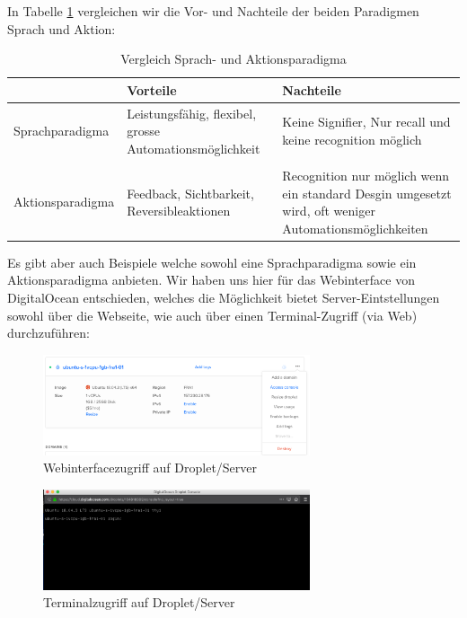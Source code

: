 \graphicspath{ {../images/} } 

In Tabelle \ref{table:1} vergleichen wir die Vor- und Nachteile der beiden Paradigmen Sprach und Aktion:
\begin{table}[h!]
\centering
  \begin{tabular}{||p{3cm}|p{5cm}|p{5cm}||} 
 \hline
 & Vorteile & Nachteile \\ [0.5ex] 
 \hline\hline
 Sprachparadigma & Leistungsfähig, flexibel, grosse Automationsmöglichkeit &
    Keine Signifier, Nur recall und keine recognition möglich \\ [1.5ex] 
    & & \\
 Aktionsparadigma & Feedback, Sichtbarkeit, Reversibleaktionen & Recognition nur
  möglich wenn ein standard Desgin umgesetzt wird, oft weniger
  Automationsmöglichkeiten \\
 \hline
\end{tabular}
\caption{Vergleich Sprach- und Aktionsparadigma}
\label{table:1}
\end{table}

Es gibt aber auch Beispiele welche sowohl eine Sprachparadigma sowie ein
Aktionsparadigma anbieten. Wir haben uns hier für das Webinterface von
DigitalOcean entschieden, welches die Möglichkeit bietet Server-Eintstellungen
sowohl über die Webseite, wie auch über einen Terminal-Zugriff (via Web)
durchzuführen:

\begin{figure}[h]
  \caption{Webinterfacezugriff auf Droplet/Server}
  \centering
  \includegraphics[width=0.7\textwidth]{digitalocean1}
\end{figure}


\begin{figure}[h]
  \caption{Terminalzugriff auf Droplet/Server}
  \centering
  \includegraphics[width=0.7\textwidth]{digitalocean2}
\end{figure}
